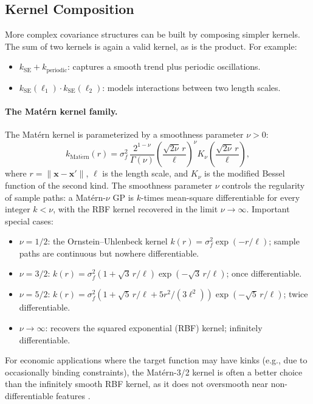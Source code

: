 \documentclass[11pt,a4paper]{report}
\newcommand{\x}{\bm{x}}
\begin{document}
\subsection{Kernel Composition}

More complex covariance structures can be built by composing simpler kernels.  The sum of two kernels is again a valid kernel, as is the product.  For example:
\begin{itemize}[itemsep=2pt]
\item $k_\mathrm{SE} + k_\mathrm{periodic}$: captures a smooth trend plus periodic oscillations.
\item $k_\mathrm{SE}(\ell_1) \cdot k_\mathrm{SE}(\ell_2)$: models interactions between two length scales.
\end{itemize}

\paragraph{The Mat\'ern kernel family.}\label{sec:matern}  The Mat\'ern kernel is parameterized by a smoothness parameter $\nu > 0$:
\begin{equation}
k_{\mathrm{Mat\acute{e}rn}}(r) = \sigma_f^2\,\frac{2^{1-\nu}}{\Gamma(\nu)}\left(\frac{\sqrt{2\nu}\, r}{\ell}\right)^\nu K_\nu\!\left(\frac{\sqrt{2\nu}\, r}{\ell}\right),
\end{equation}
where $r = \|\x - \x'\|$, $\ell$ is the length scale, and $K_\nu$ is the modified Bessel function of the second kind.  The smoothness parameter $\nu$ controls the regularity of sample paths: a Mat\'ern-$\nu$ GP is $k$-times mean-square differentiable for every integer $k < \nu$, with the RBF kernel recovered in the limit $\nu \to \infty$.  Important special cases:
\begin{itemize}[itemsep=2pt]
\item $\nu = 1/2$: the Ornstein--Uhlenbeck kernel $k(r) = \sigma_f^2 \exp(-r/\ell)$; sample paths are continuous but nowhere differentiable.
\item $\nu = 3/2$: $k(r) = \sigma_f^2(1 + \sqrt{3}\,r/\ell)\exp(-\sqrt{3}\,r/\ell)$; once differentiable.
\item $\nu = 5/2$: $k(r) = \sigma_f^2(1 + \sqrt{5}\,r/\ell + 5r^2/(3\ell^2))\exp(-\sqrt{5}\,r/\ell)$; twice differentiable.
\item $\nu \to \infty$: recovers the squared exponential (RBF) kernel; infinitely differentiable.
\end{itemize}
For economic applications where the target function may have kinks (e.g., due to occasionally binding constraints), the Mat\'ern-3/2 kernel is often a better choice than the infinitely smooth RBF kernel, as it does not oversmooth near non-differentiable features \citep{rennerscheidegger_2018}.
\end{document}
